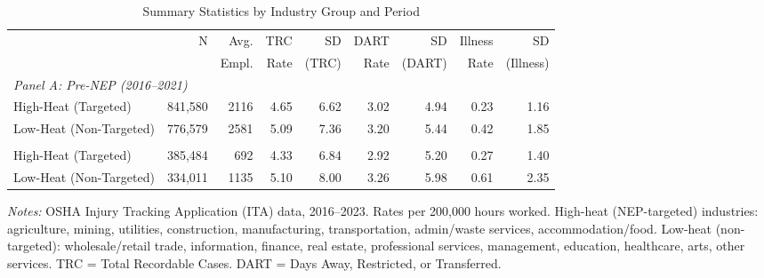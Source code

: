 \begin{table}[H]
\centering
\caption{Summary Statistics by Industry Group and Period}
\label{tab:summary}
\footnotesize
\begin{threeparttable}
\begin{tabular}{lrrrrrrrr}
\toprule
 & N & Avg. & TRC & SD & DART & SD & Illness & SD \\
 & & Empl. & Rate & (TRC) & Rate & (DART) & Rate & (Illness) \\
\midrule
\multicolumn{9}{l}{\textit{Panel A: Pre-NEP (2016--2021)}} \\
High-Heat (Targeted) & 841,580 & 2116 & 4.65 & 6.62 & 3.02 & 4.94 & 0.23 & 1.16 \\
Low-Heat (Non-Targeted) & 776,579 & 2581 & 5.09 & 7.36 & 3.20 & 5.44 & 0.42 & 1.85 \\
\addlinespace
\multicolumn{9}{l}{\textit{Panel B: Post-NEP (2022--2023)}} \\
High-Heat (Targeted) & 385,484 & 692 & 4.33 & 6.84 & 2.92 & 5.20 & 0.27 & 1.40 \\
Low-Heat (Non-Targeted) & 334,011 & 1135 & 5.10 & 8.00 & 3.26 & 5.98 & 0.61 & 2.35 \\
\bottomrule
\end{tabular}
\begin{tablenotes}[flushleft]
\footnotesize
\item \textit{Notes:} OSHA Injury Tracking Application (ITA) data, 2016--2023. Rates per 200,000 hours worked. High-heat (NEP-targeted) industries: agriculture, mining, utilities, construction, manufacturing, transportation, admin/waste services, accommodation/food. Low-heat (non-targeted): wholesale/retail trade, information, finance, real estate, professional services, management, education, healthcare, arts, other services. TRC = Total Recordable Cases. DART = Days Away, Restricted, or Transferred.
\end{tablenotes}
\end{threeparttable}
\end{table}

